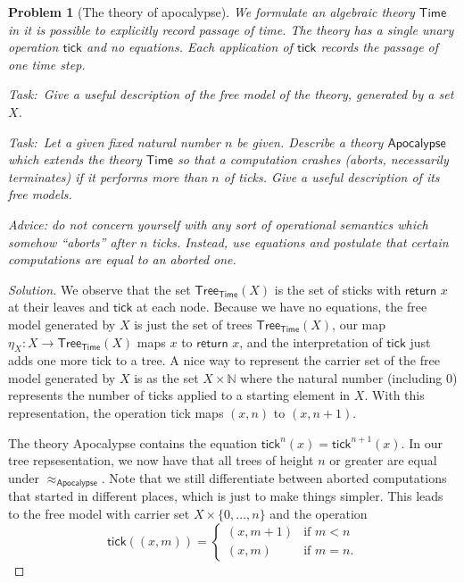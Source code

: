 \documentclass{article}
\newtheorem{problem}{Problem}[section]}
\newcommand{\task}{\par\noindent\emph{Task:}\ }
\begin{document}
    \begin{problem}[The theory of apocalypse]
    We formulate an algebraic theory $\mathsf{Time}$ in it is possible to
    explicitly record passage of time. The theory has a single unary
    operation $\mathsf{tick}$ and no equations. Each application of
    $\mathsf{tick}$ records the passage of one time step.

    \task Give a useful description of the free model of the
    theory, generated by a set $X$.

    \task Let a given fixed natural number $n$ be given.
    Describe a theory $\mathsf{Apocalypse}$ which extends the theory
    $\mathsf{Time}$ so that a computation crashes (aborts, necessarily
    terminates) if it performs more than $n$ of ticks. Give a useful
    description of its free models.

    Advice: do \emph{not} concern yourself with any sort of operational
    semantics which somehow ``aborts'' after $n$ ticks. Instead, use
    equations and postulate that certain computations are equal to an
    aborted one.
    \end{problem}
    \begin{proof}[Solution]
        We observe that the set
        $\textsf{Tree}_\textsf{Time}(X)$ is the set of sticks with
        $\textsf{return }x$ at their leaves and $\textsf{tick}$ at each node.
        Because we have no equations, the
        free model generated by $X$ is just the set of trees
        $\textsf{Tree}_\textsf{Time}(X)$, our map
        $\eta_X:X\rightarrow\textsf{Tree}_\textsf{Time}(X)$ maps $x$ to
        $\textsf{return }x$, and the interpretation of $\textsf{tick}$ just adds
        one more \textsf{tick} to a tree. A nice way to represent the carrier
        set of the free model generated by $X$ is as the set $X\times
        \mathbb{N}$ where the natural number (including 0) represents the number
        of ticks applied to a starting element in $X$. With this representation,
        the operation \textsf{tick} maps $(x,n)$ to $(x,n+1)$.

        The theory \textsf{Apocalypse} contains the equation
        $\textsf{tick}^n(x)=\textsf{tick}^{n+1}(x)$. In our tree repsesentation, we
        now have that all trees of height $n$ or greater are equal under
        $\approx_\textsf{Apocalypse}$. Note that we still differentiate between
        aborted computations that started in different places, which is just to
        make things simpler. This leads to the free model with carrier
        set $X\times\{0,\dots,n\}$ and the operation
        \[
            \textsf{tick}((x,m)) = \begin{cases}
                (x,m+1) & \text{if }m<n \\
                (x,m) & \text{if }m=n.
            \end{cases}
        \]
    \end{proof}
\end{document}
